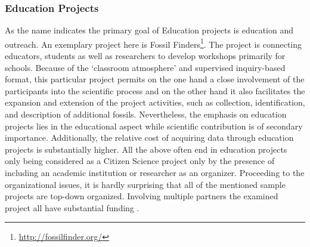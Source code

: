 \subsubsection{Education Projects}
As the name indicates the primary goal of Education projects is education and outreach. An exemplary project here is Fossil Finders\footnote{\url{http://fossilfinder.org/}}. The project is connecting educators, students as well as researchers to develop workshops primarily for schools. Because of the ‘classroom atmosphere’ and supervised inquiry-based format, this particular project permits on the one hand a close involvement of the participants into the scientific process and on the other hand it also facilitates the expansion and extension of the project activities, such as collection, identification, and description of additional fossils. Nevertheless, the emphasis on education projects lies in the educational aspect while scientific contribution is of secondary importance. Additionally, the relative cost of acquiring data through education projects is substantially higher. All the above often end in education projects only being considered as a Citizen Science project only by the presence of including an academic institution or researcher as an organizer. Proceeding to the organizational issues, it is hardly surprising that all of the mentioned sample projects are top-down organized. Involving multiple partners the examined project all have substantial funding \parencite[xx]{WigginsCrowston2011}.


